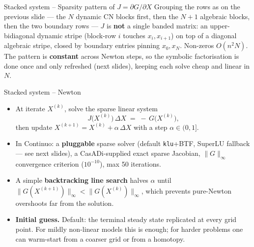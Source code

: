 \documentclass[11pt,aspectratio=169]{beamer}
\begin{document}
\begin{frame}{Stacked system -- Sparsity pattern of $J = \partial G/\partial X$}
Grouping the rows as on the previous slide — the $N$ dynamic CN blocks
first, then the $N{+}1$ algebraic blocks, then the two boundary rows —
$J$ is \textbf{not} a single banded matrix: an upper-bidiagonal dynamic
stripe (block-row $i$ touches $x_i,x_{i+1}$) on top of a diagonal
algebraic stripe, closed by boundary entries pinning $x_0,x_N$.
Non-zeros $O(n^2 N)$. The pattern is \textbf{constant} across Newton steps, so
the symbolic factorisation is done once and only refreshed (next slides),
keeping each solve cheap and linear in $N$.

\end{frame}

\begin{frame}{Stacked system -- Newton}

\begin{itemize}

\item At iterate $X^{(k)}$, solve the sparse linear system
  \[
  J\bigl(X^{(k)}\bigr)\,\Delta X \;=\; -\,G\bigl(X^{(k)}\bigr),
  \]
  then update $X^{(k+1)} = X^{(k)} + \alpha\,\Delta X$ with a
  step $\alpha\in(0,1]$.\newline

\item In Continuo: a \textbf{pluggable} sparse solver (default
  \texttt{klu}+BTF, SuperLU fallback — see next slides), a CasADi-supplied
  exact sparse Jacobian, $\|G\|_\infty$ convergence criterion ($10^{-10}$),
  max 50 iterations.\newline

\item A simple \textbf{backtracking line search} halves $\alpha$ until
  $\|G(X^{(k+1)})\|_\infty < \|G(X^{(k)})\|_\infty$, which prevents
  pure-Newton overshoots far from the solution.\newline

\item \textbf{Initial guess.} Default: the terminal steady state
  replicated at every grid point. For mildly non-linear models this is
  enough; for harder problems one can warm-start from a coarser grid
  or from a homotopy.

\end{itemize}

\end{frame}
\end{document}

